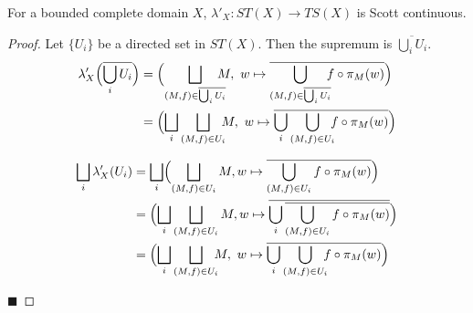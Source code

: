 \begin{proposition}
For a bounded complete domain $X$, $\lambda'_X:ST(X)\to TS(X)$ is Scott continuous.
\end{proposition}
\begin{proof}
Let $\{U_i\}$ be a directed set in $ST(X)$.  Then the supremum is $\overline{\bigcup_i U_i}$.
\begin{align*}
\lambda'_X\Bigl(\overline{\bigcup_i U_i}\Bigr) &= \Bigl(\bigsqcup_{(M,f)\in \overline{\bigcup_i U_i}} \!\!\!\!\!M,\ w\mapsto \overline{\bigcup_{(M,f)\in \overline{\bigcup_i U_i}}\!\!\! f\circ \pi_M(w)}\Bigr) \\ 
&= \Bigl(\bigsqcup_i \bigsqcup_{(M,f)\in U_i} \!\!\!M,\ w\mapsto \overline{\bigcup_i \bigcup_{(M,f)\in U_i}\!\!\! f\circ \pi_M(w)}\Bigr)
\end{align*}

\begin{align*}
\bigsqcup_i \lambda'_X(U_i) &= \bigsqcup_i \Bigl(\bigsqcup_{(M,f)\in U_i} M, w\mapsto\overline{\bigcup_{(M,f)\in U_i} f\circ \pi_M(w)}\Bigr) \\
&= \Bigl(\bigsqcup_i \bigsqcup_{(M,f)\in U_i} M, w\mapsto\overline{\bigcup_i \overline{\bigcup_{(M,f)\in U_i} f\circ \pi_M(w)}}\Bigr) \\
&= \Bigl(\bigsqcup_i \bigsqcup_{(M,f)\in U_i} \!\!\!M,\ w\mapsto \overline{\bigcup_i \bigcup_{(M,f)\in U_i}\!\!\! f\circ \pi_M(w)}\Bigr) \\
\end{align*}

\vspace{-.25in}
\hfill $\blacksquare$
\end{proof}


